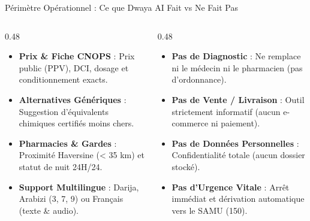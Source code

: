 \documentclass[aspectratio=169,11pt]{beamer}
\begin{document}
\begin{frame}{Périmètre Opérationnel : Ce que Dwaya AI Fait vs Ne Fait Pas}
\begin{columns}[T]
    \begin{column}{0.48\textwidth}
        \begin{tcolorbox}[colback=teal!3, colframe=primary, title=\bfseries \small $\checkmark$ Ce que le Système FAIT (Cas Attendus), arc=4pt, top=3pt, bottom=3pt, left=5pt, right=5pt]
            \begin{itemize}\setlength\itemsep{2pt}\footnotesize
                \item \textbf{Prix \& Fiche CNOPS} : Prix public (PPV), DCI, dosage et conditionnement exacts.
                \item \textbf{Alternatives Génériques} : Suggestion d'équivalents chimiques certifiés moins chers.
                \item \textbf{Pharmacies \& Gardes} : Proximité Haversine (< 35 km) et statut de nuit 24H/24.
                \item \textbf{Support Multilingue} : Darija, Arabizi (3, 7, 9) ou Français (texte \& audio).
            \end{itemize}
        \end{tcolorbox}
    \end{column}

    \begin{column}{0.48\textwidth}
        \begin{tcolorbox}[colback=red!3, colframe=warningred!85!black, title=\bfseries \small $\times$ Ce que le Système NE FAIT PAS (Garde-fous), arc=4pt, top=3pt, bottom=3pt, left=5pt, right=5pt]
            \begin{itemize}\setlength\itemsep{2pt}\footnotesize
                \item \textbf{Pas de Diagnostic} : Ne remplace ni le médecin ni le pharmacien (pas d'ordonnance).
                \item \textbf{Pas de Vente / Livraison} : Outil strictement informatif (aucun e-commerce ni paiement).
                \item \textbf{Pas de Données Personnelles} : Confidentialité totale (aucun dossier stocké).
                \item \textbf{Pas d'Urgence Vitale} : Arrêt immédiat et dérivation automatique vers le SAMU (150).
            \end{itemize}
        \end{tcolorbox}
    \end{column}
\end{columns}


\end{frame}
\end{document}

